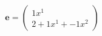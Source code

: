 \documentclass[preview]{standalone}
\begin{document}
\begin{align*}
\mathbf{e} = \begin{pmatrix}1x^{1} \\ 2 + 1x^{1} + -1x^{2}\end{pmatrix}
\end{align*}
\end{document}
